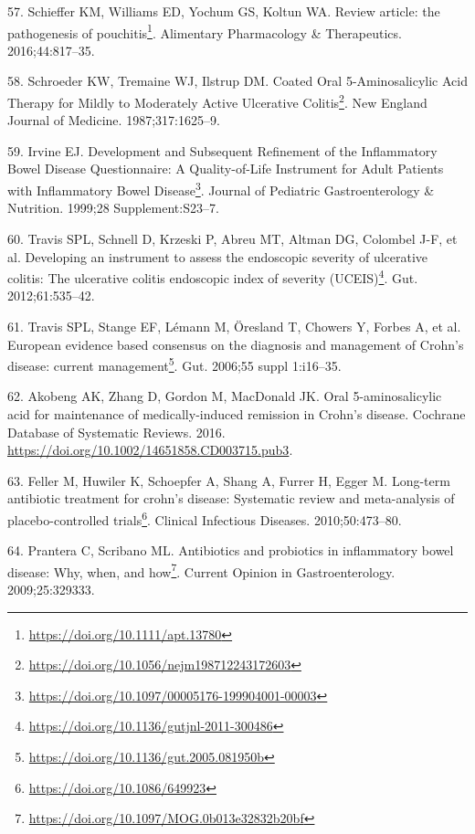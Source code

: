 \documentclass[
  a4paper,
]{book}
\DeclareRobustCommand{\href}[2]{#2\footnote{\url{#1}}}
\newlength{\cslhangindent}
\newlength{\cslentryspacingunit} %
\newenvironment{CSLReferences}[2] %
 {%
  \setlength{\parindent}{0pt}
  \ifodd #1
  \let\oldpar\par
  \def\par{\hangindent=\cslhangindent\oldpar}
  \fi
  \setlength{\parskip}{#2\cslentryspacingunit}
 }%
 {}
\begin{document}
\begin{CSLReferences}{0}{0}
\leavevmode{}%
57. Schieffer KM, Williams ED, Yochum GS, Koltun WA. \href{https://doi.org/10.1111/apt.13780}{Review article: the pathogenesis of pouchitis}. Alimentary Pharmacology \& Therapeutics. 2016;44:817--35.

\leavevmode{}%
58. Schroeder KW, Tremaine WJ, Ilstrup DM. \href{https://doi.org/10.1056/nejm198712243172603}{Coated Oral 5-Aminosalicylic Acid Therapy for Mildly to Moderately Active Ulcerative Colitis}. New England Journal of Medicine. 1987;317:1625--9.

\leavevmode{}%
59. Irvine EJ. \href{https://doi.org/10.1097/00005176-199904001-00003}{Development and Subsequent Refinement of the Inflammatory Bowel Disease Questionnaire: A Quality-of-Life Instrument for Adult Patients with Inflammatory Bowel Disease}. Journal of Pediatric Gastroenterology \& Nutrition. 1999;28 Supplement:S23--7.

\leavevmode{}%
60. Travis SPL, Schnell D, Krzeski P, Abreu MT, Altman DG, Colombel J-F, et al. \href{https://doi.org/10.1136/gutjnl-2011-300486}{Developing an instrument to assess the endoscopic severity of ulcerative colitis: The ulcerative colitis endoscopic index of severity (UCEIS)}. Gut. 2012;61:535--42.

\leavevmode{}%
61. Travis SPL, Stange EF, Lémann M, Öresland T, Chowers Y, Forbes A, et al. \href{https://doi.org/10.1136/gut.2005.081950b}{European evidence based consensus on the diagnosis and management of Crohn{'}s disease: current management}. Gut. 2006;55 suppl 1:i16--35.

\leavevmode{}%
62. Akobeng AK, Zhang D, Gordon M, MacDonald JK. Oral 5{-}aminosalicylic acid for maintenance of medically{-}induced remission in Crohn's disease. Cochrane Database of Systematic Reviews. 2016. \url{https://doi.org/10.1002/14651858.CD003715.pub3}.

\leavevmode{}%
63. Feller M, Huwiler K, Schoepfer A, Shang A, Furrer H, Egger M. \href{https://doi.org/10.1086/649923}{Long-term antibiotic treatment for crohn's disease: Systematic review and meta-analysis of placebo-controlled trials}. Clinical Infectious Diseases. 2010;50:473--80.

\leavevmode{}%
64. Prantera C, Scribano ML. \href{https://doi.org/10.1097/MOG.0b013e32832b20bf}{Antibiotics and probiotics in inflammatory bowel disease: Why, when, and how}. Current Opinion in Gastroenterology. 2009;25:329333.


\end{CSLReferences}
\end{document}
